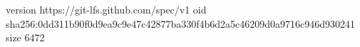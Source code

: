 version https://git-lfs.github.com/spec/v1
oid sha256:0dd311b90f0d9ea9c9e47c42877ba330f4b6d2a5c46209d0a9716c946d930241
size 6472
